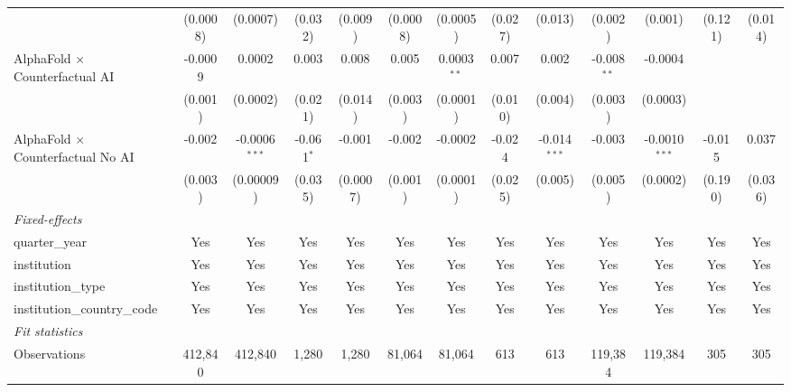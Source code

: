 \begin{tabular}{lcccccccccccc}
                                            & (0.0008)      & (0.0007)        & (0.032)      & (0.009)  & (0.0008)       & (0.0005)      & (0.027) & (0.013)        & (0.002)       & (0.001)         & (0.121) & (0.014)\\   
   AlphaFold $\times$ Counterfactual AI     & -0.0009       & 0.0002          & 0.003        & 0.008    & 0.005          & 0.0003$^{**}$ & 0.007   & 0.002          & -0.008$^{**}$ & -0.0004         &         &   \\   
                                            & (0.001)       & (0.0002)        & (0.021)      & (0.014)  & (0.003)        & (0.0001)      & (0.010) & (0.004)        & (0.003)       & (0.0003)        &         &   \\   
   AlphaFold $\times$ Counterfactual No AI  & -0.002        & -0.0006$^{***}$ & -0.061$^{*}$ & -0.001   & -0.002         & -0.0002       & -0.024  & -0.014$^{***}$ & -0.003        & -0.0010$^{***}$ & -0.015  & 0.037\\   
                                            & (0.003)       & (0.00009)       & (0.035)      & (0.0007) & (0.001)        & (0.0001)      & (0.025) & (0.005)        & (0.005)       & (0.0002)        & (0.190) & (0.036)\\   
   \midrule
   \emph{Fixed-effects}\\
   quarter\_year                            & Yes           & Yes             & Yes          & Yes      & Yes            & Yes           & Yes     & Yes            & Yes           & Yes             & Yes     & Yes\\  
   institution                              & Yes           & Yes             & Yes          & Yes      & Yes            & Yes           & Yes     & Yes            & Yes           & Yes             & Yes     & Yes\\  
   institution\_type                        & Yes           & Yes             & Yes          & Yes      & Yes            & Yes           & Yes     & Yes            & Yes           & Yes             & Yes     & Yes\\  
   institution\_country\_code               & Yes           & Yes             & Yes          & Yes      & Yes            & Yes           & Yes     & Yes            & Yes           & Yes             & Yes     & Yes\\  
   \midrule
   \emph{Fit statistics}\\
   Observations                             & 412,840       & 412,840         & 1,280        & 1,280    & 81,064         & 81,064        & 613     & 613            & 119,384       & 119,384         & 305     & 305\\  

\end{tabular}
